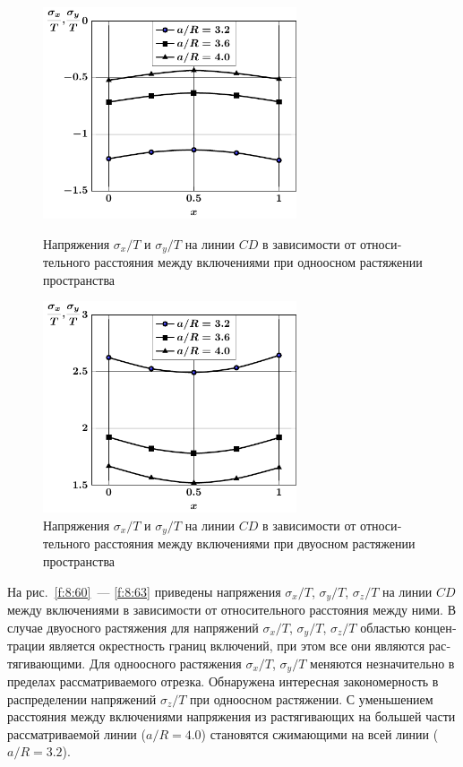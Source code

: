\begin{russian}
\begin{figure}[h!]
\centering\footnotesize
\parbox[b]{7.5cm}{\centering\includegraphics[width=7.5cm]{inc5-a-d95-g25-t1-cd-sig_x.pdf}
\caption{Напряжения $\sigma_x/T$ и $\sigma_y/T$ на линии  $CD$ в зависимости от относительного расстояния между включениями при одноосном растяжении пространства
\label{f:8:60}}}\hfil\hfil
\parbox[b]{7.5cm}{\centering\includegraphics[width=7.5cm]{inc5-a-d95-g25-t2-cd-sig_x.pdf}
\caption{Напряжения $\sigma_x/T$ и $\sigma_y/T$ на линии  $CD$ в зависимости от относительного расстояния между включениями при двуосном растяжении пространства
\label{f:8:61}}}
\end{figure}

На рис.~\ref{f:8:60}~--- \ref{f:8:63} приведены напряжения $\sigma_x/T$, $\sigma_y/T$, $\sigma_z/T$ на линии $CD$ между включениями в зависимости от относительного расстояния между ними. В случае двуосного растяжения для напряжений $\sigma_x/T$, $\sigma_y/T$, $\sigma_z/T$ областью концентрации является окрестность границ включений, при этом все они являются растягивающими. Для одноосного растяжения $\sigma_x/T$, $\sigma_y/T$ меняются незначительно в пределах рассматриваемого отрезка. Обнаружена интересная закономерность в распределении напряжений $\sigma_z/T$ при одноосном растяжении. С уменьшением расстояния между включениями напряжения из растягивающих на большей части рассматриваемой линии ($a/R=4.0$) становятся сжимающими на всей линии ($a/R=3.2$).


\end{russian}
